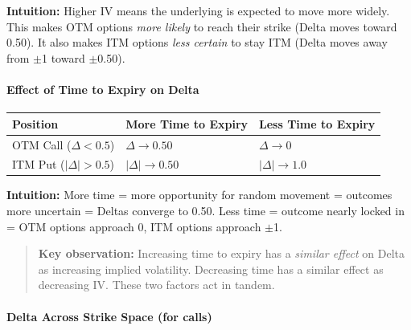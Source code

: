 \documentclass[12pt,openany]{book}
\begin{document}
\textbf{Intuition:} Higher IV means the underlying is expected to move more widely. This makes OTM options \emph{more likely} to reach their strike (Delta moves toward 0.50). It also makes ITM options \emph{less certain} to stay ITM (Delta moves away from \(\pm\)1 toward \(\pm\)0.50).

\paragraph{Effect of Time to Expiry on Delta}\par\noindent

\begin{center}
\scriptsize
\setlength{\tabcolsep}{3pt}
\begin{tabular}{|L{4.1cm}|L{4.1cm}|L{4.1cm}|}
\hline
\textbf{Position} & \textbf{More Time to Expiry} & \textbf{Less Time to Expiry} \\
\hline
OTM Call (\(\Delta < 0.5\)) & \(\Delta \rightarrow 0.50\) & \(\Delta \rightarrow 0\) \\
\hline
ITM Put (\(|\Delta| > 0.5\)) & \(|\Delta| \rightarrow 0.50\) & \(|\Delta| \rightarrow 1.0\) \\
\hline
\end{tabular}
\end{center}

\textbf{Intuition:} More time = more opportunity for random movement = outcomes more uncertain = Deltas converge to 0.50. Less time = outcome nearly locked in = OTM options approach 0, ITM options approach \(\pm\)1.

\begin{quote}
\textbf{Key observation:} Increasing time to expiry has a \emph{similar effect} on Delta as increasing implied volatility. Decreasing time has a similar effect as decreasing IV. These two factors act in tandem.
\end{quote}

\paragraph{Delta Across Strike Space (for calls)}\par\noindent
\end{document}
